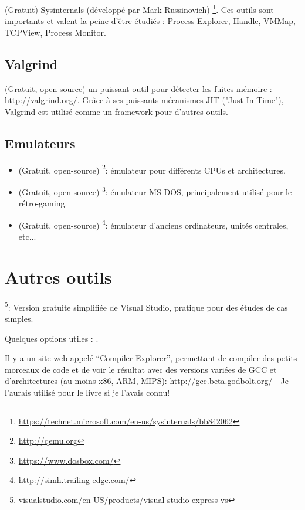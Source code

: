 (Gratuit) Sysinternals (développé par Mark Russinovich)
\footnote{\url{https://technet.microsoft.com/en-us/sysinternals/bb842062}}.
Ces outils sont importants et valent la peine d'être étudiés : Process Explorer, Handle, VMMap, TCPView, Process Monitor.

\subsection{Valgrind}

(Gratuit, open-source) un puissant outil pour détecter les fuites mémoire : \url{http://valgrind.org/}.
Grâce à ses puissants mécanismes \ac{JIT} ("Just In Time"), Valgrind est utilisé comme un framework pour d'autres outils.


\subsection{Emulateurs}

\begin{itemize}
\item (Gratuit, open-source) \footnote{\url{http://qemu.org}}: émulateur pour différents CPUs et architectures.

\item (Gratuit, open-source) \footnote{\url{https://www.dosbox.com/}}: émulateur MS-DOS, principalement utilisé pour le rétro-gaming.

\item (Gratuit, open-source) \footnote{\url{http://simh.trailing-edge.com/}}: émulateur d'anciens ordinateurs, unités centrales, etc...
\end{itemize}

\section{Autres outils}

\footnote{\href{http://go.yurichev.com/17034}{visualstudio.com/en-US/products/visual-studio-express-vs}}:
Version gratuite simplifiée de Visual Studio, pratique pour des études de cas simples.

Quelques options utiles : .

Il y a un site web appelé ``Compiler Explorer'', permettant de compiler des petits
morceaux de code et de voir le résultat avec des versions variées de GCC et d'architectures
(au moins x86, ARM, MIPS): \url{http://gcc.beta.godbolt.org/}---Je l'aurais utilisé
pour le livre si je l'avais connu!

